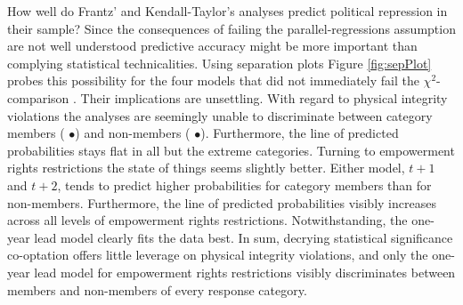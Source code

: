 How well do Frantz' and Kendall-Taylor's analyses predict 
political repression in their sample? Since the consequences
of failing the parallel-regressions assumption are not well 
understood predictive accuracy might be more important than
complying statistical technicalities. Using separation plots
Figure \ref{fig:sepPlot} probes this possibility for the 
four models that did not immediately fail the 
$\chi^2$-comparison \citep{Greenhill.2011}.
Their implications are unsettling. With regard to 
physical integrity violations the analyses are 
seemingly unable to discriminate between category 
members ({\color{darkgrey} $\bullet$}) and 
non-members ({\color{lightgrey} $\bullet$}). 
Furthermore, the line of predicted probabilities stays flat 
in all but the extreme categories. Turning to empowerment 
rights restrictions the state of things seems slightly 
better. Either model, $t+1$ and $t+2$, tends to predict 
higher probabilities for category members than for 
non-members. Furthermore, the line of predicted 
probabilities visibly increases across all levels of 
empowerment rights restrictions. Notwithstanding, the one-year 
lead model clearly fits the data best. In sum, decrying 
statistical significance co-optation offers little leverage 
on physical integrity violations, and only the one-year lead 
model for empowerment rights restrictions visibly 
discriminates between members and non-members of every 
response category.

